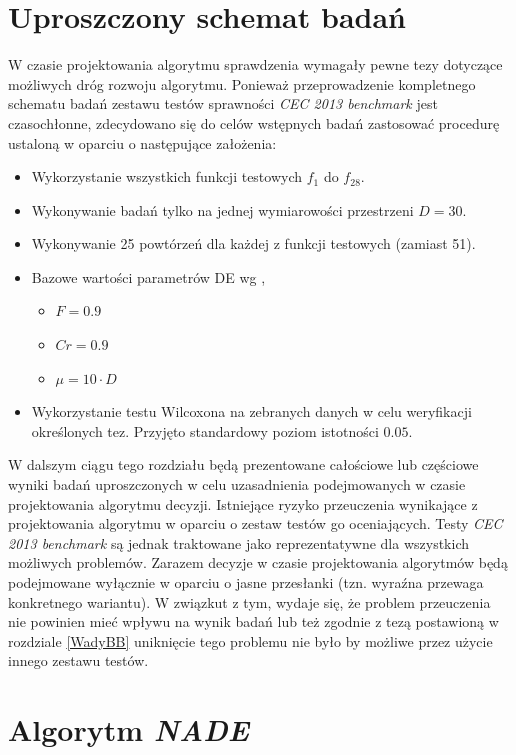\documentclass[12pt,a4paper]{report}
\begin{document}
{{{{\section{Uproszczony schemat badań}
\par{
W czasie projektowania algorytmu sprawdzenia wymagały pewne tezy dotyczące możliwych dróg rozwoju algorytmu. Ponieważ przeprowadzenie kompletnego schematu badań zestawu testów sprawności \emph{CEC 2013 benchmark} jest czasochłonne, zdecydowano się do celów wstępnych badań zastosować procedurę ustaloną w oparciu o następujące założenia:
\begin{itemize}
\item Wykorzystanie wszystkich funkcji testowych $f_1$ do $f_{28}$.
\item Wykonywanie badań tylko na jednej wymiarowości przestrzeni $D = 30$.
\item Wykonywanie 25 powtórzeń dla każdej z funkcji testowych (zamiast 51).
\item Bazowe wartości parametrów DE wg \cite{StateOfArt},
\begin{itemize}
\item $F = 0.9$
\item $Cr = 0.9$
\item $\mu = 10 \cdot D$
\end{itemize}
\item Wykorzystanie testu Wilcoxona na zebranych danych w celu weryfikacji określonych tez. Przyjęto standardowy poziom istotności $0.05$.
\end{itemize}
}
\par{
W dalszym ciągu tego rozdziału będą prezentowane całościowe lub częściowe wyniki badań uproszczonych w celu uzasadnienia podejmowanych w czasie projektowania algorytmu decyzji. Istniejące ryzyko przeuczenia wynikające z projektowania algorytmu w oparciu o zestaw testów go oceniających. Testy \emph{CEC 2013 benchmark} są jednak traktowane jako reprezentatywne dla wszystkich możliwych problemów. Zarazem decyzje w czasie projektowania algorytmów będą podejmowane wyłącznie w oparciu o jasne przesłanki (tzn. wyraźna przewaga konkretnego wariantu). W związkut z tym, wydaje się, że problem przeuczenia nie powinien mieć wpływu na wynik badań lub też zgodnie z tezą postawioną w rozdziale \ref{WadyBB} uniknięcie tego problemu nie było by możliwe przez użycie innego zestawu testów.
}
\section{Algorytm \emph{NADE}}
}}}}
\end{document}
